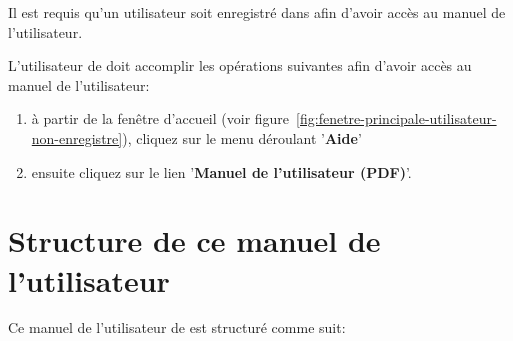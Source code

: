 Il est requis qu'un utilisateur soit enregistr\'e
dans \yeren afin d'avoir acc\`es au manuel de l'utilisateur.

L'utilisateur de \yeren doit accomplir les op\'erations
suivantes afin d'avoir acc\`es au manuel de l'utilisateur:
\begin{enumerate}[1)]
	\item \`a partir de la fen\^etre d'accueil
		(voir figure~\ref{fig:fenetre-principale-utilisateur-non-enregistre}),
		cliquez sur le menu d\'eroulant '\textbf{Aide}'
	\item ensuite cliquez sur le lien '\textbf{Manuel de l'utilisateur (PDF)}'.
\end{enumerate}

\section{Structure de ce manuel de l'utilisateur}
Ce manuel de  l'utilisateur de \yeren est structur\'e
comme suit:

